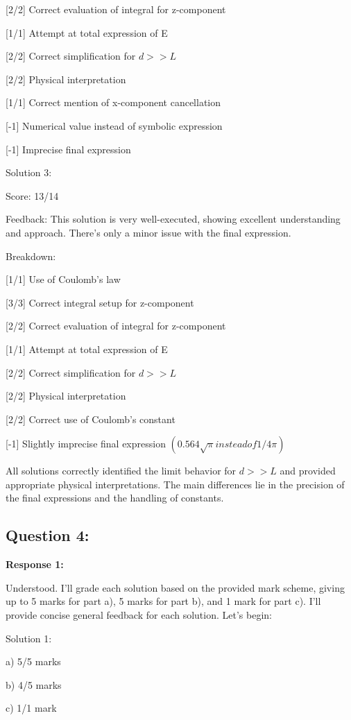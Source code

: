 \documentclass[a4paper,11pt]{article}
\begin{document}
[2/2] Correct evaluation of integral for z-component

[1/1] Attempt at total expression of E

[2/2] Correct simplification for \(d >> L\)

[2/2] Physical interpretation

[1/1] Correct mention of x-component cancellation

[-1] Numerical value instead of symbolic expression

[-1] Imprecise final expression

Solution 3:

Score: 13/14

Feedback: This solution is very well-executed, showing excellent understanding and approach. There's only a minor issue with the final expression.

Breakdown:

[1/1] Use of Coulomb's law

[3/3] Correct integral setup for z-component

[2/2] Correct evaluation of integral for z-component

[1/1] Attempt at total expression of E

[2/2] Correct simplification for \(d >> L\)

[2/2] Physical interpretation

[2/2] Correct use of Coulomb's constant

[-1] Slightly imprecise final expression \( (0.564\sqrt{\pi} instead of 1/4\pi) \)

All solutions correctly identified the limit behavior for \(d >> L\) and provided appropriate physical interpretations. The main differences lie in the precision of the final expressions and the handling of constants.

\subsection*{Question 4:}

\textbf{Response 1:}

Understood. I'll grade each solution based on the provided mark scheme, giving up to 5 marks for part a), 5 marks for part b), and 1 mark for part c). I'll provide concise general feedback for each solution. Let's begin:

Solution 1:

a) 5/5 marks

b) 4/5 marks

c) 1/1 mark
\end{document}
